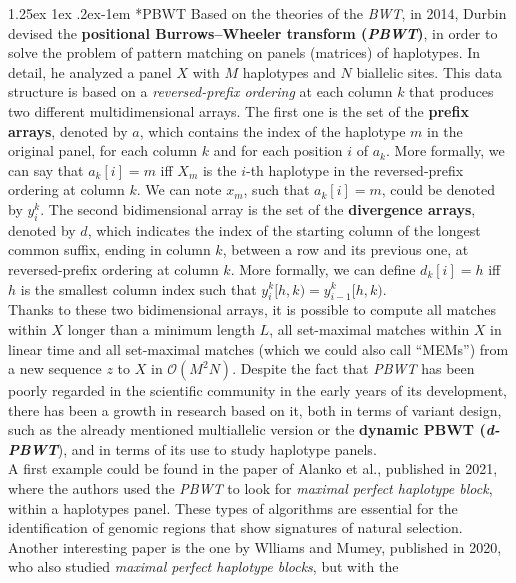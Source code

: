 \documentclass[a4paper,11pt, oneside]{article}
\makeatletter
\renewcommand{\paragraph}{%
  \@startsection{paragraph}{4}%
  {\z@}{1.25ex \@plus 1ex \@minus .2ex}{-1em}%
  {\normalfont\normalsize\bfseries}%
}
\makeatother
\begin{document}
\paragraph*{PBWT}
Based on the theories of the \textit{BWT}, in 2014, Durbin devised the
\textbf{positional Burrows–Wheeler transform (\textit{PBWT})}, in order to
solve the problem of pattern matching on panels (matrices) of haplotypes. In
detail, he analyzed a panel $X$ with $M$ haplotypes and $N$ biallelic
sites. This data structure is based on a \textit{reversed-prefix ordering} at
each column $k$ that produces two different multidimensional arrays. The first
one is the set of the \textbf{prefix arrays}, denoted by $a$, which contains the
index of the haplotype $m$ in the original panel, for each column $k$ and for  
each position $i$ of $a_k$. More formally, we can say that $a_k[i]=m$ iff $X_m$
is the $i$-th haplotype in the reversed-prefix ordering at column $k$. We can
note $x_m$, such that $a_k[i]=m$, could be denoted by $y_i^k$. The second
bidimensional array is the set of the \textbf{divergence arrays}, denoted by
$d$, which indicates the index of the starting column of the longest common
suffix, ending in column $k$, between a row and its previous one, at
reversed-prefix ordering at column $k$. More formally, we can define $d_k[i]=h$
iff $h$ is the smallest column index such that $y_i^k[h,k)=y_{i-1}^k[h,k)$. \\
Thanks to these two bidimensional arrays, it is possible to compute all matches
within $X$ longer than a minimum length $L$, all set-maximal matches within $X$
in linear time and all set-maximal matches (which we could also call ``MEMs'')
from a new sequence $z$ to $X$ in $\mathcal{O}(M^2N)$.
Despite the fact that \textit{PBWT} has been poorly regarded in the scientific
community in the early years of its development, there has been a growth in
research based on it, both in terms of variant design, such as the already
mentioned multiallelic version or the \textbf{dynamic PBWT (\textit{d-PBWT}}),
and in terms of its use to study haplotype panels.\\
A first example could be found in the paper of Alanko et al., published in
2021, where the authors used the \textit{PBWT} to look for \textit{maximal
  perfect haplotype block}, within a haplotypes panel. These types of
algorithms are essential for the identification of genomic regions that show
signatures of natural selection.\\
Another interesting paper is the one by Wlliams and Mumey, published in 2020,
who also studied \textit{maximal perfect haplotype blocks}, but with the
\end{document}
